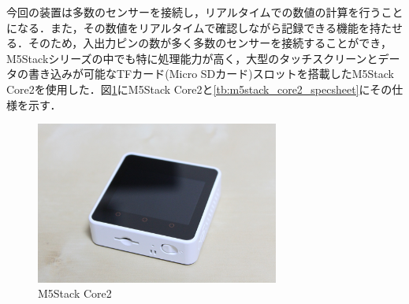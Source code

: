 今回の装置は多数のセンサーを接続し，リアルタイムでの数値の計算を行うことになる．また，その数値をリアルタイムで確認しながら記録できる機能を持たせる．そのため，入出力ピンの数が多く多数のセンサーを接続することができ，M5Stackシリーズの中でも特に処理能力が高く，大型のタッチスクリーンとデータの書き込みが可能なTFカード(Micro SDカード)スロットを搭載したM5Stack Core2を使用した．図\ref{fig:m5stack_core2}にM5Stack Core2と\ref{tb:m5stack_core2_specsheet}にその仕様を示す．

\begin{figure}[H]
  \begin{center}
    \includegraphics[width=8cm]{fig/m5stack_core2}
    \caption{M5Stack Core2}
    \label{fig:m5stack_core2}
  \end{center}
\end{figure}

